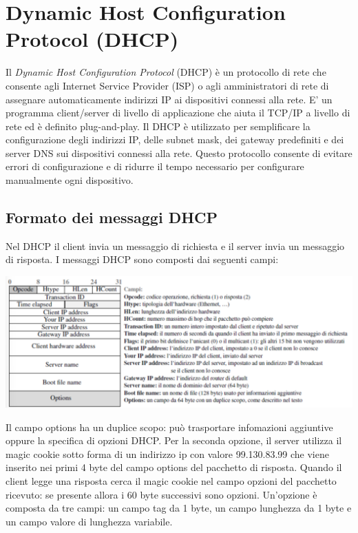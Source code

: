 \documentclass[12pt]{report}
\begin{document}
\section{Dynamic Host Configuration Protocol (DHCP)}
Il \textit{Dynamic Host Configuration Protocol} (DHCP) è un protocollo di rete che consente agli Internet Service Provider (ISP) o agli amministratori di rete di assegnare automaticamente indirizzi IP ai dispositivi connessi alla rete. E' un programma client/server di livello di applicazione che aiuta il TCP/IP a livello di rete ed è definito plug-and-play. Il DHCP è utilizzato per semplificare la configurazione degli indirizzi IP, delle subnet mask, dei gateway predefiniti e dei server DNS sui dispositivi connessi alla rete. Questo protocollo consente di evitare errori di configurazione e di ridurre il tempo necessario per configurare manualmente ogni dispositivo.

\subsection{Formato dei messaggi DHCP}
Nel DHCP il client invia un messaggio di richiesta e il server invia un messaggio di risposta. I messaggi DHCP sono composti dai seguenti campi:
\begin{center}
	\includegraphics[scale=0.35]{assets/dhcp-message.png}
\end{center}
Il campo options ha un duplice scopo: può trasportare infomazioni aggiuntive oppure la specifica di opzioni DHCP. Per la seconda opzione, il server utilizza il magic cookie sotto forma di un indirizzo ip con valore 99.130.83.99 che viene inserito nei primi 4 byte del campo options del pacchetto di risposta. Quando il client legge una risposta cerca il magic cookie nel campo opzioni del pacchetto ricevuto: se presente allora i 60 byte successivi sono opzioni. Un'opzione è composta da tre campi: un campo tag da 1 byte, un campo lunghezza da 1 byte e un campo valore di lunghezza variabile.
\end{document}

